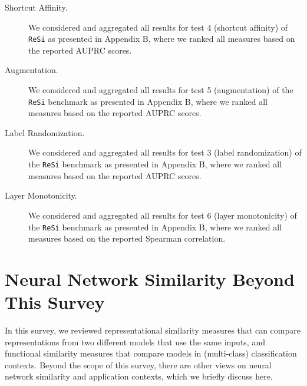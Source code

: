 \documentclass{article}
\begin{document}
\begin{refsegment}
\begin{description}
%
    \item[Shortcut Affinity.] We considered and aggregated all results for test 4 (shortcut affinity) of \texttt{ReSi} \cite{resi_benchmark_2024} as presented in Appendix B, where we ranked all measures based on the reported AUPRC scores.
%
    \item[Augmentation.] We considered and aggregated all results for test 5 (augmentation) of the \texttt{ReSi} benchmark \cite{resi_benchmark_2024} as presented in Appendix B, where we ranked all measures based on the reported AUPRC scores.
%
    \item[Label Randomization.] We considered and aggregated all results for test 3 (label randomization) of the \texttt{ReSi} benchmark \cite{resi_benchmark_2024} as presented in Appendix B, where we ranked all measures based on the reported AUPRC scores.
%
    \item[Layer Monotonicity.] We considered and aggregated all results for test 6 (layer monotonicity) of the \texttt{ReSi} benchmark \cite{resi_benchmark_2024} as presented in Appendix B, where we ranked all measures based on the reported Spearman correlation.
\end{description}


\section{Neural Network Similarity Beyond This Survey}\label{sec:alt_similarity}
In this survey, we reviewed representational similarity measures that can compare representations from two different models that use the same inputs, and functional similarity measures that compare models in (multi-class) classification contexts.
Beyond the scope of this survey, there are other views on neural network similarity and application contexts, which we briefly discuss here.


\end{refsegment}
\end{document}
